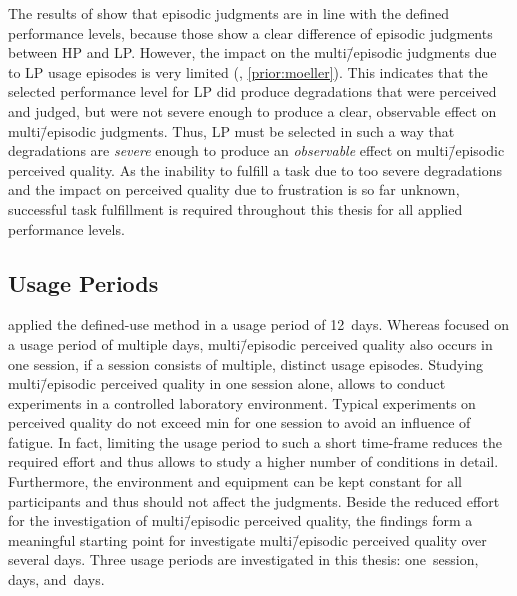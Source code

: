 The results of \citet{moller_single-call_2011} show that episodic judgments are in line with the defined performance levels, because those show a clear difference of episodic judgments between \ac{HP} and \ac{LP}.
However, the impact on the multi\=/episodic judgments due to \ac{LP} usage episodes is very limited (\cf, \autoref{prior:moeller}).
This indicates that the selected performance level for \ac{LP} did produce degradations that were perceived and judged, but were not severe enough to produce a clear, observable effect on multi\=/episodic judgments.
Thus, \ac{LP} must be selected in such a way that degradations are \emph{severe} enough to produce an \emph{observable} effect on multi\=/episodic perceived quality.
As the inability to fulfill a task due to too severe degradations and the impact on perceived quality due to frustration is so far unknown, successful task fulfillment is required throughout this thesis for all applied performance levels.

\subsection{Usage Periods}
\citet{moller_single-call_2011} applied the defined-use method in a usage period of 12~days. 
Whereas \citet{moller_single-call_2011} focused on a usage period of multiple days, multi\=/episodic perceived quality also occurs in one session, if a session consists of multiple, distinct usage episodes.
Studying multi\=/episodic perceived quality in one session alone, allows to conduct experiments in a controlled laboratory environment. %
Typical experiments on perceived quality do not exceed \unit[90]{min} for one session to avoid an influence of fatigue.
In fact, limiting the usage period to such a short time-frame reduces the required effort and thus allows to study a higher number of conditions in detail.
Furthermore, the environment and equipment can be kept constant for all participants and thus should not affect the judgments.
Beside the reduced effort for the investigation of multi\=/episodic perceived quality, the findings form a meaningful starting point for investigate multi\=/episodic perceived quality over several days.
Three usage periods are investigated in this thesis: one~session, \unit[6]{days}, and~\unit[14]{days}.


